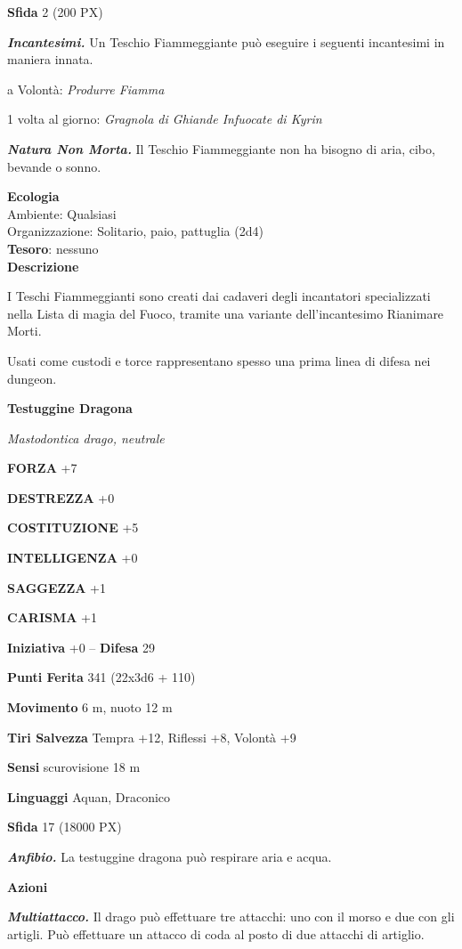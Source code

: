 \begin{multicols}{2}
\textbf{Sfida} 2 (200 PX)

\textit{\textbf{Incantesimi.}} Un Teschio Fiammeggiante può eseguire i seguenti incantesimi in maniera innata.

a Volontà: \textit{Produrre Fiamma}

1 volta al giorno: \textit{Gragnola di Ghiande Infuocate di Kyrin}

\textit{\textbf{Natura Non Morta.}} Il Teschio Fiammeggiante non ha bisogno di aria, cibo, bevande o sonno.

\textbf{Ecologia}\\
Ambiente: Qualsiasi\\
Organizzazione: Solitario, paio, pattuglia (2d4)\\
\textbf{Tesoro}: nessuno\\

\textbf{Descrizione}

I Teschi Fiammeggianti sono creati dai cadaveri degli incantatori specializzati nella Lista di magia del Fuoco, tramite una variante dell'incantesimo Rianimare Morti.

Usati come custodi e torce rappresentano spesso una prima linea di difesa nei dungeon.

\medskip{}\textbf{Testuggine Dragona}

\textit{Mastodontica drago, neutrale}

\textbf{FORZA} +7

\textbf{DESTREZZA} +0

\textbf{COSTITUZIONE} +5

\textbf{INTELLIGENZA} +0

\textbf{SAGGEZZA} +1

\textbf{CARISMA} +1

\textbf{Iniziativa} +0 -- \textbf{Difesa} 29

\textbf{Punti Ferita} 341 (22x3d6 + 110)

\textbf{Movimento} 6 m, nuoto 12 m

\textbf{Tiri Salvezza} Tempra +12, Riflessi +8, Volontà +9

\textbf{Sensi} scurovisione 18 m

\textbf{Linguaggi} Aquan, Draconico

\textbf{Sfida} 17 (18000 PX)

\textit{\textbf{Anfibio.}} La testuggine dragona può respirare aria e acqua.

\textbf{Azioni}

\textit{\textbf{Multiattacco.}} Il drago può effettuare tre attacchi: uno con il morso e due con gli artigli. Può effettuare un attacco di coda al posto di due attacchi di artiglio.


\end{multicols}

